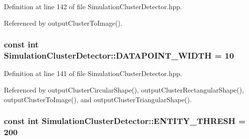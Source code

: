 \-Definition at line 142 of file \-Simulation\-Cluster\-Detector.\-hpp.



\-Referenced by output\-Cluster\-To\-Image().

\hypertarget{classmultiscale_1_1analysis_1_1SimulationClusterDetector_a16d99d22863feed83960e6b9efe407a2}{
\subsubsection[{\-D\-A\-T\-A\-P\-O\-I\-N\-T\-\_\-\-W\-I\-D\-T\-H}]{\setlength{\rightskip}{0pt plus 5cm}const int {\bf \-Simulation\-Cluster\-Detector\-::\-D\-A\-T\-A\-P\-O\-I\-N\-T\-\_\-\-W\-I\-D\-T\-H} = 10}}\label{classmultiscale_1_1analysis_1_1SimulationClusterDetector_a16d99d22863feed83960e6b9efe407a2}


\-Definition at line 141 of file \-Simulation\-Cluster\-Detector.\-hpp.



\-Referenced by output\-Cluster\-Circular\-Shape(), output\-Cluster\-Rectangular\-Shape(), output\-Cluster\-To\-Image(), and output\-Cluster\-Triangular\-Shape().

\hypertarget{classmultiscale_1_1analysis_1_1SimulationClusterDetector_ad161524f0da7d2414e616fff59f02118}{
\subsubsection[{\-E\-N\-T\-I\-T\-Y\-\_\-\-T\-H\-R\-E\-S\-H}]{\setlength{\rightskip}{0pt plus 5cm}const int {\bf \-Simulation\-Cluster\-Detector\-::\-E\-N\-T\-I\-T\-Y\-\_\-\-T\-H\-R\-E\-S\-H} = 200}}\label{classmultiscale_1_1analysis_1_1SimulationClusterDetector_ad161524f0da7d2414e616fff59f02118}


